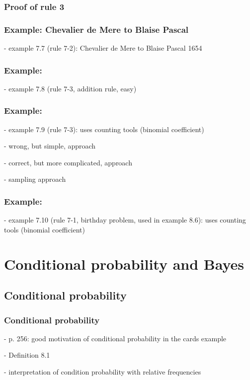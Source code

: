 \begin{frame}
    \frametitle{Proof of rule 3}

\end{frame}

\begin{frame}
    \frametitle{Example: Chevalier de Mere to Blaise Pascal}

    - example 7.7 (rule 7-2): Chevalier de Mere to Blaise Pascal 1654

\end{frame}

\begin{frame}
    \frametitle{Example:}

    - example 7.8 (rule 7-3, addition rule, easy)

\end{frame}

\begin{frame}
    \frametitle{Example:}

    - example 7.9 (rule 7-3): uses counting tools (binomial coefficient)

        - wrong, but simple, approach

        - correct, but more complicated, approach

        - sampling approach

\end{frame}

\begin{frame}
    \frametitle{Example:}

    - example 7.10 (rule 7-1, birthday problem, used in example 8.6): uses counting tools (binomial coefficient)

\end{frame}

\section{Conditional probability and Bayes}

\subsection{Conditional probability}

\begin{frame}
    \frametitle{Conditional probability}

- p. 256: good motivation of conditional probability in the cards example

- Definition 8.1

- interpretation of condition probability with relative frequencies

\end{frame}

